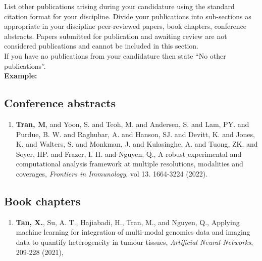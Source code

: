 \begin{instructional}
    List other publications arising during your candidature using the standard citation format for your discipline. Divide your publications into sub-sections as appropriate in your discipline \eg{} peer-reviewed papers, book chapters, conference abstracts. Papers submitted for publication and awaiting review are not considered publications and cannot be included in this section.\\
    
    \noindent
    If you have no publications from your candidature then state ``No other publications''.\\
    
    \textbf{Example:}
    \subsection*{Conference abstracts}

    \begin{enumerate}

    \item \cite{naval2022benchmarking} \textbf{Tran, M}, and Yoon, S. and Teoh, M. and Andersen, S. and Lam, PY. and Purdue, B. W. and Raghubar, A. and Hanson, SJ. and Devitt, K. and Jones, K. and Walters, S. and Monkman, J. and Kulasinghe, A. and Tuong, ZK. and Soyer, HP. and Frazer, I. H. and Nguyen, Q., A robust experimental and computational analysis framework at multiple resolutions, modalities and coverages, \textit{Frontiers in Immunology}, vol 13. 1664-3224 (2022).

    \end{enumerate}

    \subsection*{Book chapters} 

    \begin{enumerate}

    \item \cite{tan2021applying} \textbf{Tan, X.}, Su, A. T., Hajiabadi, H., Tran, M., and Nguyen, Q., Applying machine learning for integration of multi-modal genomics data and imaging data to quantify heterogeneity in tumour tissues, \textit{Artificial Neural Networks}, 209-228 (2021),


    \end{enumerate}

\end{instructional}


